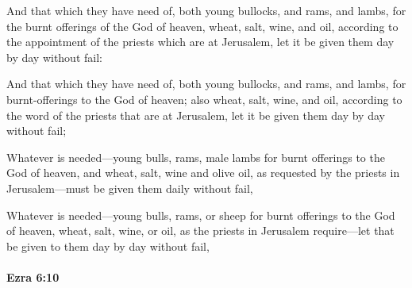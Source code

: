 			And that which they have need of, both young bullocks, and rams, and lambs, for the burnt offerings of the God of heaven, wheat, salt, wine, and oil, according to the appointment of the priests which are at Jerusalem, let it be given them day by day without fail:

			\begin{versebox}
					\item[BHS] 
					\item[LXX] 
					\item[ASV] And that which they have need of, both young bullocks, and rams, and lambs, for burnt-offerings to the God of heaven; also wheat, salt, wine, and oil, according to the word of the priests that are at Jerusalem, let it be given them day by day without fail;
					\item[NIV] Whatever is needed—young bulls, rams, male lambs for burnt offerings to the God of heaven, and wheat, salt, wine and olive oil, as requested by the priests in Jerusalem—must be given them daily without fail,
					\item[NRSV] Whatever is needed—young bulls, rams, or sheep for burnt offerings to the God of heaven, wheat, salt, wine, or oil, as the priests in Jerusalem require—let that be given to them day by day without fail,
			\end{versebox}

		\paragraph{Ezra 6:10} %
			\label{EZRA-6-10}

